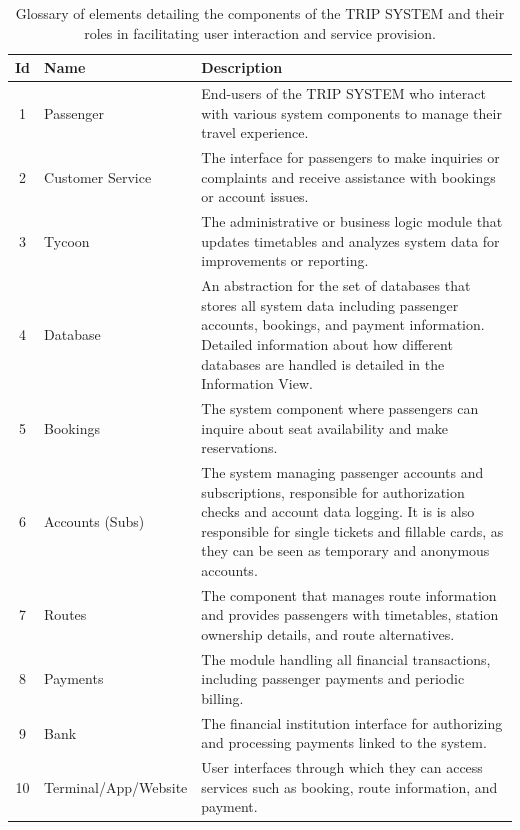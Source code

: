 \begin{table}[H]
    \centering
    \begin{tabular}{@{}clp{9cm}@{}}
    \toprule
    \textbf{Id} & \textbf{Name} & \textbf{Description} \\
    \midrule
    1 & Passenger & End-users of the TRIP SYSTEM who interact with various system components to manage their travel experience. \\
    2 & Customer Service & The interface for passengers to make inquiries or complaints and receive assistance with bookings or account issues. \\
    3 & Tycoon & The administrative or business logic module that updates timetables and analyzes system data for improvements or reporting. \\
    4 & Database & An abstraction for the set of databases that stores all system data including passenger accounts, bookings, and payment information. Detailed information about how different databases are handled is detailed in the Information View.\\
    5 & Bookings & The system component where passengers can inquire about seat availability and make reservations. \\
    6 & Accounts (Subs) & The system managing passenger accounts and subscriptions, responsible for authorization checks and account data logging. 
    It is is also responsible for single tickets and fillable cards, as they can be seen as temporary and anonymous accounts. \\
    7 & Routes & The component that manages route information and provides passengers with timetables, station ownership details, and route alternatives. \\
    8 & Payments & The module handling all financial transactions, including passenger payments and periodic billing. \\
    9 & Bank & The financial institution interface for authorizing and processing payments linked to the system. \\
    10 & Terminal/App/Website & User interfaces through which they can access services such as booking, route information, and payment. \\
    \bottomrule
    \end{tabular}
    \caption{Glossary of elements detailing the components of the TRIP SYSTEM and their roles in facilitating user interaction and service provision.}
    \label{tab:glossary_trip_system}
\end{table}

